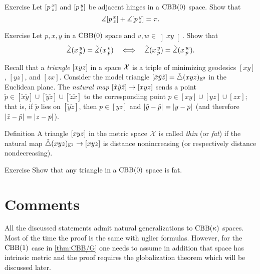 \begin{thm}{Exercise}\label{ex:adjacent-CBB}
Let $[p\,{}^{x}_{z}]$ and $[p\,{}^{y}_{z}]$ be adjacent hinges in a $\mathrm{CBB}(0)$ space.
Show that
\[\measuredangle[p\,{}^{x}_{z}]+\measuredangle[p\,{}^{y}_{z}]= \pi.\]
\end{thm}


\begin{thm}{Exercise}
\label{ex:pxyvw}
Let 
$p,x,y$ in a $\mathrm{CBB}(0)$ space
and $v,w\in \left]xy\right[$.
Show that  
\[
\tilde\measuredangle(x\,{}^{y}_{p})=\tilde\measuredangle(x\,{}^{v}_{p})
\quad\Longleftrightarrow\quad
\tilde\measuredangle(x\,{}^{y}_{p})=\tilde\measuredangle(x\,{}^{w}_{p}).
\]

\end{thm}

Recall that a \emph{triangle} $[xyz]$ in a space $\mathcal{X}$ 
is a triple of minimizing geodesics $[xy]$, $[yz]$, and $[zx]$.
Consider the  model triangle $[\tilde x\tilde y\tilde z]=\tilde\triangle{}({x}{y}{z})_{\mathbb{E}^2}$ in the Euclidean plane.
The \emph{natural map} $[\tilde x\tilde y\tilde z]\to [xyz]$ 
sends a point $\tilde p\in[\tilde x\tilde y]\cup[\tilde y\tilde z]\cup[\tilde z\tilde x]$ to the corresponding point $p\in[ x y]\cup[y z]\cup[ z x]$;
that is, if $\tilde p$ lies on $[\tilde y\tilde z]$,
then $p\in [y z]$ and $\dist{\tilde y}{\tilde p}{}=\dist{y}{p}{}$ (and therefore $\dist{\tilde z}{\tilde p}{}=\dist{z}{p}{}$).
 
\begin{thm}{Definition}\label{def:k-thin}
A triangle $[xyz]$ in the metric space $\mathcal{X}$ 
is called \emph{thin} (or \emph{fat}) if the natural map $\tilde\triangle{}({x}{y}{z})_{\mathbb{E}^2}\to [xyz]$ is distance nonincreasing (or respectively distance nondecreasing).

\end{thm}

\begin{thm}{Exercise}\label{ex:fat}
Show that any triangle in a $\mathrm{CBB}(0)$ space is fat.
\end{thm}

\section{Comments}

All the discussed statements admit natural generalizations to $\mathrm{CBB}(\kappa)$ spaces.
Most of the time the proof is the same with uglier formulas.
However, for the $\mathrm{CBB}(1)$ case in \ref{thm:CBB/G} one needs to assume in addition that space has intrinsic metric and the proof requires the globalization theorem which will be discussed later.


